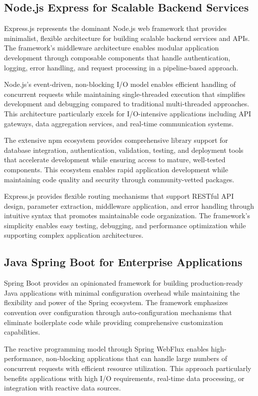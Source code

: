 \subsection{Node.js Express for Scalable Backend Services}

Express.js represents the dominant Node.js web framework that provides minimalist, flexible architecture for building scalable backend services and APIs. The framework's middleware architecture enables modular application development through composable components that handle authentication, logging, error handling, and request processing in a pipeline-based approach.

Node.js's event-driven, non-blocking I/O model enables efficient handling of concurrent requests while maintaining single-threaded execution that simplifies development and debugging compared to traditional multi-threaded approaches. This architecture particularly excels for I/O-intensive applications including API gateways, data aggregation services, and real-time communication systems.

The extensive npm ecosystem provides comprehensive library support for database integration, authentication, validation, testing, and deployment tools that accelerate development while ensuring access to mature, well-tested components. This ecosystem enables rapid application development while maintaining code quality and security through community-vetted packages.

Express.js provides flexible routing mechanisms that support RESTful API design, parameter extraction, middleware application, and error handling through intuitive syntax that promotes maintainable code organization. The framework's simplicity enables easy testing, debugging, and performance optimization while supporting complex application architectures.

\subsection{Java Spring Boot for Enterprise Applications}

Spring Boot provides an opinionated framework for building production-ready Java applications with minimal configuration overhead while maintaining the flexibility and power of the Spring ecosystem. The framework emphasizes convention over configuration through auto-configuration mechanisms that eliminate boilerplate code while providing comprehensive customization capabilities.

The reactive programming model through Spring WebFlux enables high-performance, non-blocking applications that can handle large numbers of concurrent requests with efficient resource utilization. This approach particularly benefits applications with high I/O requirements, real-time data processing, or integration with reactive data sources.


